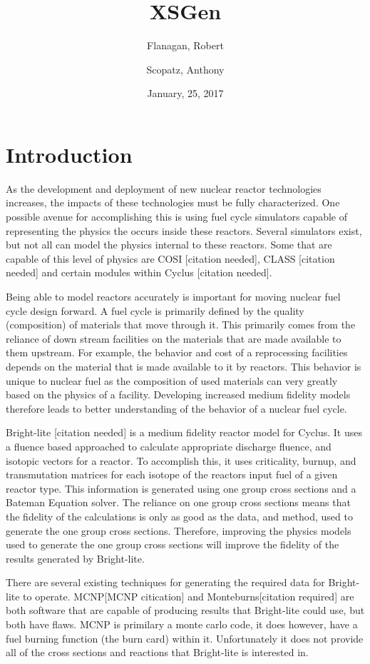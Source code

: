 \documentclass{article}
\begin{document}
\title{XSGen}
\date{January, 25, 2017}
\author{Flanagan, Robert \and Scopatz, Anthony}
\maketitle

\section{Introduction}
As the development and deployment of new nuclear reactor technologies increases, the impacts of these technologies must be fully characterized. One possible avenue for accomplishing this is using fuel cycle simulators capable of representing the physics the occurs inside these reactors. Several simulators exist, but not all can model the physics internal to these reactors. Some that are capable of this level of physics are COSI [citation needed], CLASS [citation needed] and certain modules within Cyclus [citation needed]. 

Being able to model reactors accurately is important for moving nuclear fuel cycle design forward. A fuel cycle is primarily defined by the quality (composition) of materials that move through it. This primarily comes from the reliance of down stream facilities on the materials that are made available to them upstream. For example, the behavior and cost of a reprocessing facilities depends on the material that is made available to it by reactors. This behavior is unique to nuclear fuel as the composition of used materials can very greatly based on the physics of a facility. Developing increased medium fidelity models therefore leads to better understanding of the behavior of a nuclear fuel cycle. 

Bright-lite [citation needed] is a medium fidelity reactor model for Cyclus. It uses a fluence based approached to calculate appropriate discharge fluence, and isotopic vectors for a reactor. To accomplish this, it uses criticality, burnup, and transmutation matrices for each isotope of the reactors input fuel of a given reactor type. This information is generated using one group cross sections and a Bateman Equation solver. The reliance on one group cross sections means that the fidelity of the calculations is only as good as the data, and method, used to generate the one group cross sections. Therefore, improving the physics models used to generate the one group cross sections will improve the fidelity of the results generated by Bright-lite. 

There are several existing techniques for generating the required data for Bright-lite to operate. MCNP[MCNP citication] and Monteburns[citation required] are both software that are capable of producing results that Bright-lite could use, but both have flaws. MCNP is primilary a monte carlo code, it does however, have a fuel burning function (the burn card) within it. Unfortunately it does not provide all of the cross sections and reactions that Bright-lite is interested in. 
\end{document}
